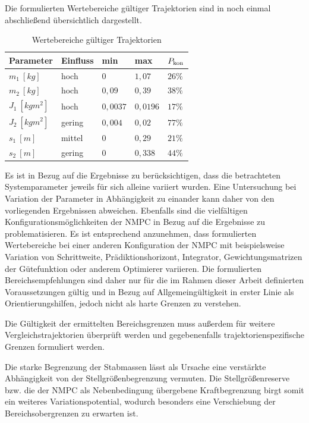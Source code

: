 Die formulierten Wertebereiche gültiger Trajektorien sind in  noch einmal abschließend übersichtlich dargestellt. 
\begin{table}[h]
	\centering
	\caption{Wertebereiche gültiger Trajektorien}
		\begin{tabular}{lllll}
			\toprule
			Parameter  & Einfluss & min & max & $P_{\mathrm{kon}}$ \\
			\midrule
			{$m_1 \ [\unit{kg}]$}  &  hoch & $0$ & $1,07$  & $26 \%$ \\
			$m_2 \ [\unit{kg}]$  &  hoch & $0,09$ & $0,39$  & $38 \%$ \\	
			$J_1 \ [\unit{kg m^2}]$  &  hoch & $0,0037$ & $0,0196$  & $17 \%$ \\
			$J_2 \ [\unit{kg m^2}]$ & gering & $0,004$ & $0,02$  & $77 \%$ \\
			$s_1 \ [\unit{m}]$   &   mittel & $0$ & $0,29$  & $21 \%$ \\
			$s_2 \ [\unit{m}]$   &   gering & $0$ & $0,338$  & $44 \%$ \\
			\bottomrule
		\end{tabular}
	\label{tab:Bereichsempfehlungen}
\end{table}

Es ist in Bezug auf die Ergebnisse zu berücksichtigen, dass die betrachteten Systemparameter jeweils für sich alleine variiert wurden. Eine Untersuchung bei Variation der Parameter in Abhängigkeit zu einander kann daher von den vorliegenden Ergebnissen abweichen. Ebenfalls sind die vielfältigen Konfigurationsmöglichkeiten der NMPC in Bezug auf die Ergebnisse zu problematisieren. Es ist entsprechend anzunehmen, dass formulierten Wertebereiche bei einer anderen Konfiguration der NMPC mit beispielsweise Variation von Schrittweite, Prädiktionshorizont, Integrator, Gewichtungsmatrizen der Gütefunktion oder anderem Optimierer variieren. Die formulierten Bereichsempfehlungen sind daher nur für die im Rahmen dieser Arbeit definierten Voraussetzungen gültig und in Bezug auf Allgemeingültigkeit in erster Linie als Orientierungshilfen, jedoch nicht als harte Grenzen zu verstehen. 

Die Gültigkeit der ermittelten Bereichsgrenzen muss außerdem für weitere Vergleichstrajektorien überprüft werden und gegebenenfalls trajektorienspezifische Grenzen formuliert werden. 

Die starke Begrenzung der Stabmassen lässt als Ursache eine verstärkte Abhängigkeit von der Stellgrößenbegrenzung vermuten.
Die Stellgrößenreserve bzw. die der NMPC als Nebenbedingung übergebene Kraftbegrenzung birgt somit ein weiteres Variationspotential, wodurch besonders eine Verschiebung der Bereichsobergrenzen zu erwarten ist. 

